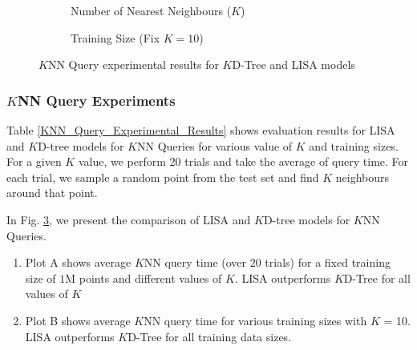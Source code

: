 \begin{figure}
 \centering
     \begin{subfigure}[h]{0.45\textwidth}
         \centering
         
         \caption{Number of Nearest Neighbours ($K$)}
         \label{fig:2d_exp2_3_1}
     \end{subfigure}
     \begin{subfigure}[h]{0.45\textwidth}
         \centering
         
         \caption{Training Size (Fix $K=10$)}
         \label{fig:2d_exp2_3_2}
     \end{subfigure}
     \caption{$K$NN Query experimental results for $K$D-Tree and LISA models}
        \label{fig:KNN_Query_Comparision}
\end{figure}

\subsubsection {$K$NN Query Experiments}
Table \ref{KNN_Query_Experimental_Results} shows evaluation results for LISA and $K$D-tree models for $K$NN Queries for various value of $K$ and training sizes. For a given $K$ value, we perform 20 trials and take the average of query time. For each trial, we sample a random point from the test set and find $K$ neighbours around that point. 


	In Fig. \ref{fig:KNN_Query_Comparision}, we present the comparison of LISA and $K$D-tree models for $K$NN Queries.
	\begin{enumerate}
		\item Plot A shows average $K$NN query time (over $20$ trials) for a fixed training size of $1$M points and different values of $K$. LISA outperforms $K$D-Tree for all values of $K$
		
		\item Plot B shows average $K$NN query time for various training sizes with $K$ = 10. LISA outperforms $K$D-Tree for all training data sizes.
	\end{enumerate}



